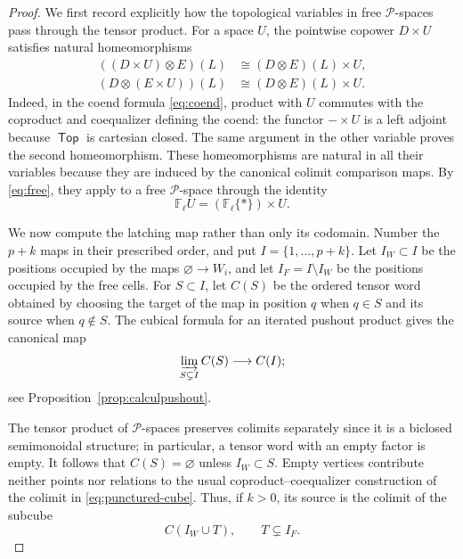 \documentclass[12pt,a4paper]{amsart}
\newcommand{\Top}{\mathop{\mathsf{Top}}}
\newcommand{\Pcat}{\mathcal P}
\newcommand{\Ffree}{\mathbb F}
\newcommand{\liminj}{\varinjlim}
\theoremstyle{definition}
\begin{document}
\begin{proof}
	We first record explicitly how the topological variables in free \(\Pcat\)-spaces pass through the tensor product.  For a space \(U\), the pointwise copower \(D\times U\) satisfies natural homeomorphisms
	\begin{align}
		((D\times U)\otimes E)(L)&\cong(D\otimes E)(L)\times U,\label{eq:copower-left}\\
		(D\otimes(E\times U))(L)&\cong(D\otimes E)(L)\times U.\label{eq:copower-right}
	\end{align}
	Indeed, in the coend formula \eqref{eq:coend}, product with \(U\) commutes with the coproduct and coequalizer defining the coend: the functor \(-\times U\) is a left adjoint because \(\Top\) is cartesian closed.  The same argument in the other variable proves the second homeomorphism.  These homeomorphisms are natural in all their variables because they are induced by the canonical colimit comparison maps.  By \eqref{eq:free}, they apply to a free \(\Pcat\)-space through the identity
	\begin{equation}\label{eq:free-copower}
		\Ffree_\ell U=(\Ffree_\ell\{*\})\times U.
	\end{equation}
	
	We now compute the latching map rather than only its codomain.  Number the \(p+k\) maps in their prescribed order, and put \(I=\{1,\ldots,p+k\}\).  Let \(I_W\subset I\) be the positions occupied by the maps \(\varnothing\to W_i\), and let \(I_F=I\setminus I_W\) be the positions occupied by the free cells.  For \(S\subset I\), let \(C(S)\) be the ordered tensor word obtained by choosing the target of the map in position \(q\) when \(q\in S\) and its source when \(q\notin S\).  The cubical formula for an iterated pushout product gives the canonical map
	\begin{equation}\label{eq:punctured-cube}
		\liminj_{S\subsetneq I}C(S)\longrightarrow C(I);
	\end{equation}
	see Proposition~\ref{prop:calculpushout}.
	
	The tensor product of \(\Pcat\)-spaces preserves colimits separately since it is a biclosed semimonoidal structure; in particular, a tensor word with an empty factor is empty.  It follows that \(C(S)=\varnothing\) unless \(I_W\subset S\).  Empty vertices contribute neither points nor relations to the usual coproduct--coequalizer construction of the colimit in \eqref{eq:punctured-cube}.  Thus, if \(k>0\), its source is the colimit of the subcube
	\[
	C(I_W\cup T),\qquad T\subsetneq I_F.
	\]
	

\end{proof}
\end{document}
